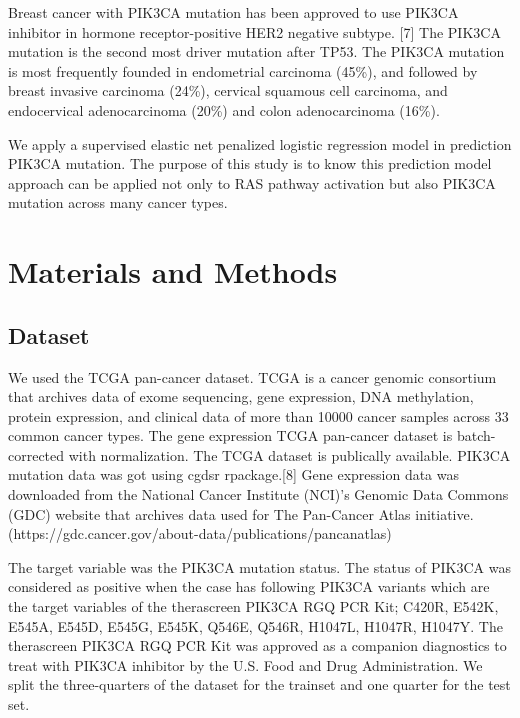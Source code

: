 \documentclass[10pt,letterpaper]{article}
\begin{document}
Breast cancer with PIK3CA mutation has been approved to use PIK3CA
inhibitor in hormone receptor-positive HER2 negative subtype. {[}7{]}
The PIK3CA mutation is the second most driver mutation after TP53. The
PIK3CA mutation is most frequently founded in endometrial carcinoma
(45\%), and followed by breast invasive carcinoma (24\%), cervical
squamous cell carcinoma, and endocervical adenocarcinoma (20\%) and
colon adenocarcinoma (16\%).

We apply a supervised elastic net penalized logistic regression model in
prediction PIK3CA mutation. The purpose of this study is to know this
prediction model approach can be applied not only to RAS pathway
activation but also PIK3CA mutation across many cancer types.

\hypertarget{materials-and-methods}{%
\section{Materials and Methods}\label{materials-and-methods}}

\hypertarget{dataset}{%
\subsection{Dataset}\label{dataset}}

We used the TCGA pan-cancer dataset. TCGA is a cancer genomic consortium
that archives data of exome sequencing, gene expression, DNA
methylation, protein expression, and clinical data of more than 10000
cancer samples across 33 common cancer types. The gene expression TCGA
pan-cancer dataset is batch-corrected with normalization. The TCGA
dataset is publically available. PIK3CA mutation data was got using
cgdsr rpackage.{[}8{]} Gene expression data was downloaded from the
National Cancer Institute (NCI)'s Genomic Data Commons (GDC) website
that archives data used for The Pan-Cancer Atlas initiative.
(https://gdc.cancer.gov/about-data/publications/pancanatlas)

The target variable was the PIK3CA mutation status. The status of PIK3CA
was considered as positive when the case has following PIK3CA variants
which are the target variables of the therascreen PIK3CA RGQ PCR Kit;
C420R, E542K, E545A, E545D, E545G, E545K, Q546E, Q546R, H1047L, H1047R,
H1047Y. The therascreen PIK3CA RGQ PCR Kit was approved as a companion
diagnostics to treat with PIK3CA inhibitor by the U.S. Food and Drug
Administration. We split the three-quarters of the dataset for the
trainset and one quarter for the test set.
\end{document}
